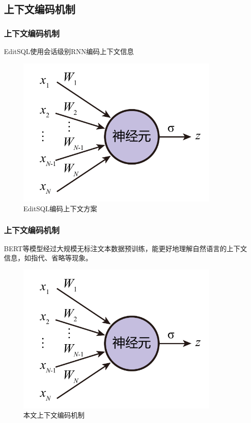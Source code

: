 \documentclass{ctexbeamer}
\begin{document}
\subsection{上下文编码机制}
\begin{frame}
  \frametitle{上下文编码机制}
  EditSQL使用会话级别RNN编码上下文信息
  \begin{figure}
    \includegraphics[page=8,width=0.9\textwidth]{figure/figures.pdf}
    \caption{EditSQL编码上下文方案}
  \end{figure}
\end{frame}
\begin{frame}
  \frametitle{上下文编码机制}
  BERT等模型经过大规模无标注文本数据预训练，能更好地理解自然语言的上下文信息，如指代、省略等现象。
  \begin{figure}
    \includegraphics[page=9,width=0.9\textwidth]{figure/figures.pdf}
    \caption{本文上下文编码机制}
  \end{figure}
\end{frame}
\end{document}

